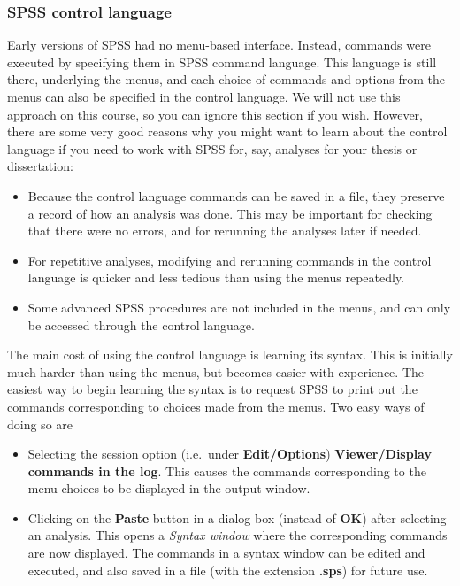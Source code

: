 \subsubsection{SPSS control language}

Early versions of SPSS had no menu-based interface. Instead, commands
were executed by specifying them in SPSS command language. This language
is still there, underlying the menus, and each choice of commands and
options from the menus can also be specified in the control language. We
will not use this approach on this course, so you can ignore this
section if you wish. However, there are some very good reasons why you
might want to learn about the control language if you need to work with
SPSS for, say, analyses for your thesis or dissertation:
\begin{itemize}
\item
Because the control language commands can be saved in a file, they
preserve a record of how an analysis was done. This may be important for
checking that there were no errors, and for rerunning the analyses later
if needed.
\item
For repetitive analyses, modifying and rerunning commands in the control
language is quicker and less tedious than using the menus repeatedly.
\item
Some advanced SPSS procedures are not included in the menus, and
can only be accessed through the control language.
\end{itemize}
The main cost of using the control language is learning its syntax. This
is initially much harder than using the menus, but becomes easier with
experience. The easiest way to begin learning the syntax is to request
SPSS to print out the commands corresponding to choices made from the
menus. Two easy ways of doing so are
\begin{itemize}
\item
Selecting the session option (i.e.\ under \textbf{Edit/Options})
\textbf{Viewer/Display commands in the log}. This causes the commands
corresponding to the menu choices to be displayed in the output window.
\item
Clicking on the \textbf{Paste} button in a dialog box (instead of
\textbf{OK}) after selecting an analysis. This opens a \emph{Syntax
window} where the corresponding commands are now displayed. The commands
in a syntax window can be edited and executed, and also saved in a file
(with the extension \textbf{.sps}) for future use.
\end{itemize}

